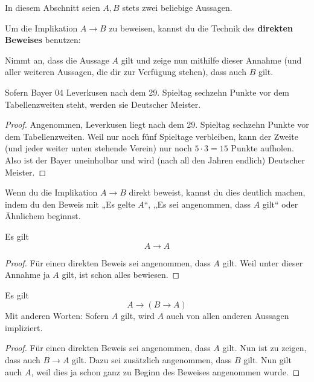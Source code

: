 In diesem Abschnitt seien $A,B$ stets zwei beliebige Aussagen.


\begin{axiom} \label{direkterbeweis} 
    Um die Implikation $A\to B$ zu beweisen, kannst du die Technik des \textbf{direkten Beweises} benutzen:
    
    Nimmt an, dass die Aussage $A$ gilt und zeige nun mithilfe dieser Annahme (und aller weiteren Aussagen, die dir zur Verfügung stehen), dass auch $B$ gilt.
\end{axiom}


\begin{bsp}
    Sofern Bayer 04 Leverkusen nach dem 29. Spieltag sechzehn Punkte vor dem Tabellenzweiten steht, werden sie Deutscher Meister.
\end{bsp}
\begin{proof}
    Angenommen, Leverkusen liegt nach dem 29. Spieltag sechzehn Punkte vor dem Tabellenzweiten. Weil nur noch fünf Spieltage verbleiben, kann der Zweite (und jeder weiter unten stehende Verein) nur noch $5\cdot 3=15$ Punkte aufholen. Also ist der Bayer uneinholbar und wird (nach all den Jahren endlich) Deutscher Meister.
\end{proof}
  
  
\begin{bem}[Signalwörter]
    Wenn du die Implikation $A\to B$ direkt beweist, kannst du dies deutlich machen, indem du den Beweis mit „Es gelte $A$“, „Es sei angenommen, dass $A$ gilt“ oder Ähnlichem beginnst.
\end{bem}

  
\begin{satz} \label{implikationref}
    Es gilt
    \[ A\to A \]
\end{satz}
\begin{proof}
    Für einen direkten Beweis sei angenommen, dass $A$ gilt. Weil unter dieser Annahme ja $A$ gilt, ist schon alles bewiesen.
\end{proof}

  
\begin{satz}\label{wahresausbeliebigem}
    Es gilt
        \[ A \to (B\to A)   \]
    Mit anderen Worten: Sofern $A$ gilt, wird $A$ auch von allen anderen Aussagen impliziert.
\end{satz}
\begin{proof}
    Für einen direkten Beweis sei angenommen, dass $A$ gilt. Nun ist zu zeigen, dass auch $B\to A$ gilt. Dazu sei zusätzlich angenommen, dass $B$ gilt. Nun gilt auch $A$, weil dies ja schon ganz zu Beginn des Beweises angenommen wurde.
\end{proof}


